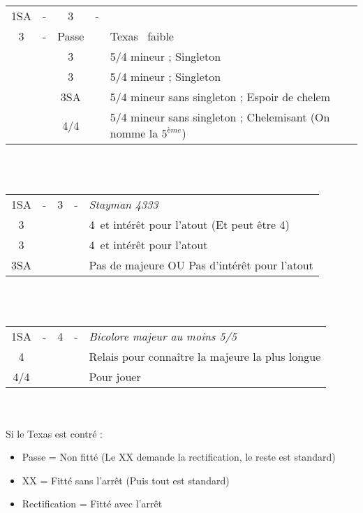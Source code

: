 \documentclass[a4paper, oneside, 11pt]{report}
\begin{document}
		\begin{tabular}{cccc|l}
		1SA & - & 3\trefle & - &\\
		3\carreau & - & Passe && Texas \carreau\ faible\\
		&& 3\coeur && 5/4 mineur ; Singleton \pique\\
		&& 3\pique && 5/4 mineur ; Singleton \coeur\\
		&& 3SA && 5/4 mineur sans singleton ; Espoir de chelem\\
		&& 4\trefle/4\carreau && 5/4 mineur sans singleton ; Chelemisant (On nomme la $5^{ème}$)\\
		\end{tabular}\\\\
	
		\begin{tabular}{cccc|l}
		1SA & - & 3\carreau & - & \it{Stayman 4333}\\
		3\coeur &&&& 4\coeur\ et intérêt pour l'atout (Et peut être 4\pique)\\
		3\pique &&&& 4\pique\ et intérêt pour l'atout\\
		3SA &&&& Pas de majeure OU Pas d'intérêt pour l'atout\\
		\end{tabular}\\\\
	
		\begin{tabular}{cccc|l}
		1SA & - & 4\trefle & - & \it{Bicolore majeur au moins 5/5}\\
		4\carreau &&&& Relais pour connaître la majeure la plus longue\\
		4\coeur/4\pique &&&& Pour jouer\\
		\end{tabular}\\\\

\newpage
		Si le Texas est contré :
		\begin{itemize}
		\item Passe = Non fitté (Le XX demande la rectification, le reste est standard)
		\item XX = Fitté sans l'arrêt (Puis tout est standard)
		\item Rectification = Fitté avec l'arrêt\\
		\end{itemize}
		
\end{document}
